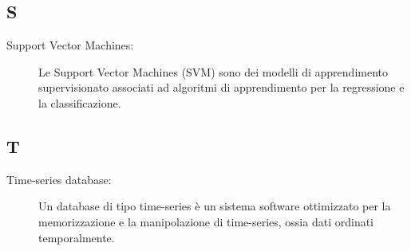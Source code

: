 \documentclass[../manuale-sviluppatore.tex]{subfiles}
\begin{document}
\subsection*{S}
\begin{description}
  \item[Support Vector Machines:] Le Support Vector Machines (SVM) sono dei modelli di apprendimento supervisionato associati ad algoritmi di apprendimento per la regressione e la classificazione.
\end{description}

\subsection*{T}
\begin{description}
  \item [Time-series database:] Un database di tipo time-series è un sistema software ottimizzato per la memorizzazione e la manipolazione di time-series, ossia dati ordinati temporalmente.
\end{description}
\end{document}
